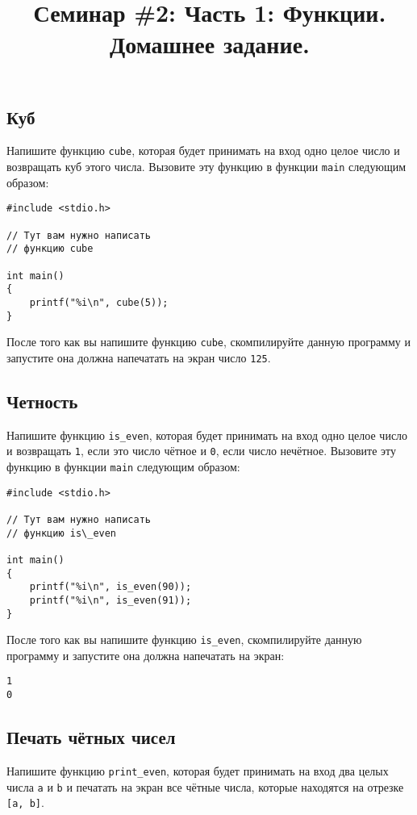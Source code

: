 \documentclass[10pt]{article}
\begin{document}
\title{Семинар \#2: Часть 1: Функции. Домашнее задание. \vspace{-5ex}}\date{}\maketitle
\subsection{Куб}
Напишите функцию \texttt{cube}, которая будет принимать на вход одно целое число и возвращать куб этого числа. Вызовите эту функцию в функции \texttt{main} следующим образом:
\begin{lstlisting}
#include <stdio.h>

// Тут вам нужно написать
// функцию cube

int main()
{
    printf("%i\n", cube(5));
}
\end{lstlisting}

После того как вы напишите функцию \texttt{cube}, скомпилируйте данную программу и запустите она должна напечатать на экран число \texttt{125}.


\subsection{Четность}
Напишите функцию \texttt{is\_even}, которая будет принимать на вход одно целое число и возвращать \texttt{1}, если это число чётное и \texttt{0}, если число нечётное. Вызовите эту функцию в функции \texttt{main} следующим образом:
\begin{lstlisting}
#include <stdio.h>

// Тут вам нужно написать
// функцию is\_even

int main()
{
    printf("%i\n", is_even(90));
    printf("%i\n", is_even(91));
}
\end{lstlisting}
После того как вы напишите функцию \texttt{is\_even}, скомпилируйте данную программу и запустите она должна напечатать на экран:
\begin{verbatim}
1
0
\end{verbatim}

\subsection{Печать чётных чисел}
Напишите функцию \texttt{print\_even}, которая будет принимать на вход два целых числа \texttt{a} и \texttt{b} и печатать на экран все чётные числа, которые находятся на отрезке \texttt{[a, b]}.
\end{document}

